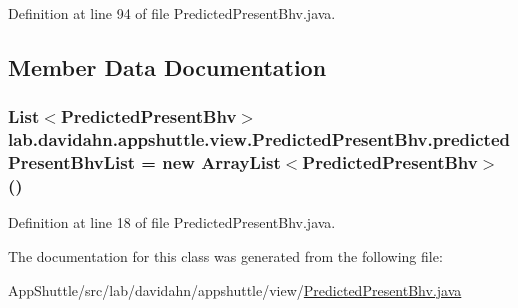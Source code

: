 \-Definition at line 94 of file \-Predicted\-Present\-Bhv.\-java.



\subsection{\-Member \-Data \-Documentation}
\hypertarget{classlab_1_1davidahn_1_1appshuttle_1_1view_1_1_predicted_present_bhv_a6fda1694da2824819fb2ab9d1dbcad43}{
\subsubsection[{predicted\-Present\-Bhv\-List}]{\setlength{\rightskip}{0pt plus 5cm}\-List$<${\bf \-Predicted\-Present\-Bhv}$>$ {\bf lab.\-davidahn.\-appshuttle.\-view.\-Predicted\-Present\-Bhv.\-predicted\-Present\-Bhv\-List} = new \-Array\-List$<${\bf \-Predicted\-Present\-Bhv}$>$()}}\label{classlab_1_1davidahn_1_1appshuttle_1_1view_1_1_predicted_present_bhv_a6fda1694da2824819fb2ab9d1dbcad43}


\-Definition at line 18 of file \-Predicted\-Present\-Bhv.\-java.



\-The documentation for this class was generated from the following file\-:\begin{DoxyCompactItemize}
\item 
\-App\-Shuttle/src/lab/davidahn/appshuttle/view/\hyperlink{_predicted_present_bhv_8java}{\-Predicted\-Present\-Bhv.\-java}\end{DoxyCompactItemize}
